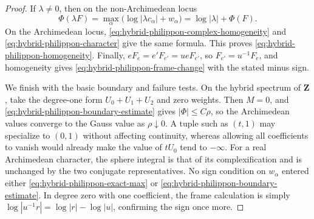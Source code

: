 \begin{proof}
If \(\lambda\ne0\), then on the non-Archimedean locus
\[
 \Phi(\lambda F)=\max_\alpha
 \bigl(\log|\lambda c_\alpha|+w_\alpha\bigr)
 =\log|\lambda|+\Phi(F).
\]
On the Archimedean locus,
\eqref{eq:hybrid-philippon-complex-homogeneity} and
\eqref{eq:hybrid-philippon-character} give the same formula.  This proves
\eqref{eq:hybrid-philippon-homogeneity}.  Finally,
\(eF_e=e'F_{e'}=ueF_{e'}\), so \(F_{e'}=u^{-1}F_e\), and homogeneity gives
\eqref{eq:hybrid-philippon-frame-change} with the stated minus sign.

We finish with the basic boundary and failure tests.  On the hybrid spectrum
of \(\mathbf Z\), take the degree-one form \(U_0+U_1+U_2\) and zero weights.
Then \(M=0\), and \eqref{eq:hybrid-philippon-boundary-estimate} gives
\(|\Phi|\leq C\rho\), so the Archimedean values converge to the Gauss value
as \(\rho\downarrow0\).  A tuple such as \((t,1)\) may specialize to
\((0,1)\) without affecting continuity, whereas allowing all coefficients
to vanish would already make the value of \(tU_0\) tend to \(-\infty\).
For a real Archimedean character, the sphere integral is that of its
complexification and is unchanged by the two conjugate representatives.
No sign condition on \(w_\alpha\) entered either
\eqref{eq:hybrid-philippon-exact-max} or
\eqref{eq:hybrid-philippon-boundary-estimate}.  In degree zero with one
coefficient, the frame calculation is simply
\(\log|u^{-1}r|=\log|r|-\log|u|\), confirming the sign once more.
\end{proof}
